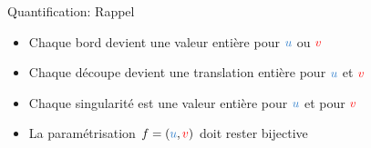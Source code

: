 \begin{frame}{Quantification: Rappel}
\begin{tikzpicture}[scale=1.38]
	\end{tikzpicture}
    \begin{itemize}
        \item Chaque bord devient une valeur entière pour $\blue{u}$ ou $\red{v}$
        \item Chaque découpe devient une translation entière pour $\blue{u}$ et $\red{v}$
        \item Chaque singularité est une valeur entière pour $\blue{u}$ et pour $\red{v}$
		\item La paramétrisation $f = (\blue{u}, \red{v})$ doit rester bijective
    \end{itemize}
\end{frame}

